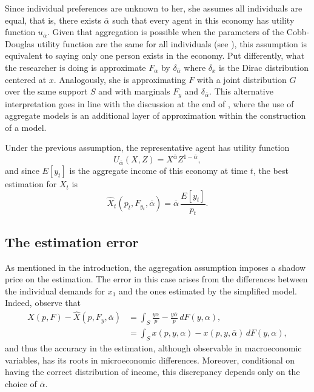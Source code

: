 \documentclass[english, a4paper, 12pt]{article}
\begin{document}
Since individual preferences are unknown to her, she assumes all individuals are equal, that is, there exists $\overline{\alpha}$ such that every agent in this economy has utility function $u_{\overline{\alpha}}$. Given that aggregation is possible when the parameters of the Cobb-Douglas utility function are the same for all individuals (see ), this assumption is equivalent to saying only one person exists in the economy. Put differently, what the researcher is doing is approximate $F_{\alpha}$ by $\delta_{\overline{\alpha}}$ where $\delta_{x}$ is the Dirac distribution centered at $x$. Analogously, she is approximating $F$ with a joint distribution $G$ over the same support $S$ and with marginals $F_{y}$ and $\delta_{\overline{\alpha}}$. This alternative interpretation goes in line with the discussion at the end of , where the use of aggregate models is an additional layer of approximation within the construction of a model.

Under the previous assumption, the representative agent has utility function
	$$U_{\overline{\alpha}}(X, Z) = X^{\overline{\alpha}}Z^{1-\overline{\alpha}},$$
and since $E[y_{t}]$ is the aggregate income of this economy at time $t$, the best estimation for $X_{t}$ is
	$$\widehat{X}_{t}(p_{t}, F_{y_{t}}, \overline{\alpha}) = \overline{\alpha}\, \frac{E[y_{t}]}{p_{t}}.$$

\subsection{The estimation error} \label{ssec:RepAgError}
As mentioned in the introduction, the aggregation assumption imposes a shadow price on the estimation. The error in this case arises from the differences between the individual demands for $x_{1}$ and the ones estimated by the simplified model. Indeed, observe that
	\begin{align*}
		X(p, F) - \widehat{X}(p, F_{y}, \overline{\alpha})
			&=	\int_{S} \frac{y \alpha}{p} - \frac{y\overline{\alpha}}{p} \, dF(y,\alpha),	\\
			&=	\int_{S} x(p, y, \alpha) - x(p, y, \overline{\alpha}) \, dF(y,\alpha),
	\end{align*}
and thus the accuracy in the estimation, although observable in macroeconomic variables, has its roots in microeconomic differences. Moreover, conditional on having the correct distribution of income, this discrepancy depends only on the choice of $\overline{\alpha}$. 
\end{document}
